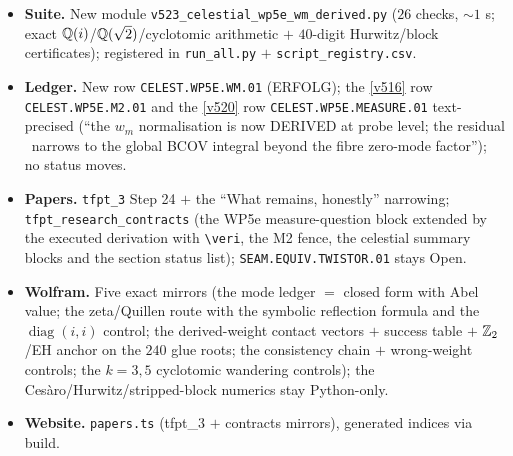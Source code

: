 \begin{itemize}[leftmargin=1.5em]
\item \textbf{Suite.} New module \texttt{v523\_celestial\_wp5e\_wm\_derived.py} ($26$ checks,
$\sim1$ s; exact $\mathbb{Q}(i)$/$\mathbb{Q}(\sqrt2)$/cyclotomic arithmetic $+$ $40$-digit Hurwitz/block
certificates); registered in \texttt{run\_all.py} $+$ \texttt{script\_registry.csv}.
\item \textbf{Ledger.} New row \texttt{CELEST.WP5E.WM.01} (ERFOLG); the \vref{v516} row
\texttt{CELEST.WP5E.M2.01} and the \vref{v520} row \texttt{CELEST.WP5E.MEASURE.01}
text-precised (``the $w_m$ normalisation is now DERIVED at probe level; the residual \mO\
narrows to the global BCOV integral beyond the fibre zero-mode factor''); no status moves.
\item \textbf{Papers.} \texttt{tfpt\_3} Step 24 $+$ the ``What remains, honestly'' narrowing;
\texttt{tfpt\_research\_contracts} (the WP5e measure-question block extended by the executed
derivation with \texttt{\textbackslash veri}, the M2 fence, the celestial summary blocks and
the section status list); \texttt{SEAM.EQUIV.TWISTOR.01} stays Open.
\item \textbf{Wolfram.} Five exact mirrors (the mode ledger $=$ closed form with Abel value;
the zeta/Quillen route with the symbolic reflection formula and the $\operatorname{diag}(i,i)$
control; the derived-weight contact vectors $+$ success table $+$ $\mathbb{Z}_2$/EH anchor on the
$240$ glue roots; the consistency chain $+$ wrong-weight controls; the $k=3,5$ cyclotomic
wandering controls); the Ces\`aro/Hurwitz/stripped-block numerics stay Python-only.
\item \textbf{Website.} \texttt{papers.ts} (tfpt\_3 $+$ contracts mirrors), generated indices
via build.
\end{itemize}

